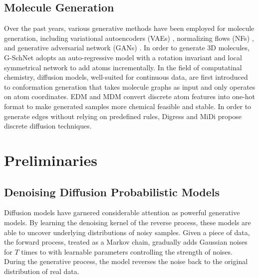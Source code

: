 \documentclass[letterpaper]{article} %
\begin{document}
\subsection{Molecule Generation}
Over the past years, various generative methods have been employed for molecule generation, including variational autoencoders (VAEs) \cite{vae_13_kingma}, normalizing flows (NFs) \cite{nice_15_dinh}, and generative adversarial network (GANs) \cite{gan_14_goodfellow}. In order to generate 3D molecules, G-SchNet \cite{gschnet_19_wallach} adopts an auto-regressive model with a rotation invariant and local symmetrical network to add atoms incrementally.
In the field of computatinal chemistry, diffusion models, well-suited for continuous data, are first introduced to conformation generation that takes molecule graphs as input and only operates on atom coordinates.
EDM \cite{edm_22_hoogeboom} and MDM \cite{mdm_23_huang} convert discrete atom features into one-hot format to make generated samples more chemical feasible and stable. In order to generate edges without relying on predefined rules, Digress \cite{digress_22_vignac} and MiDi \cite{midi_23_vignac} propose discrete diffusion techniques.





\section{Preliminaries}
\subsection{Denoising Diffusion Probabilistic Models}
Diffusion models have garnered considerable attention as powerful generative models. By learning the denoising kernel of the reverse process, these models are able to uncover underlying distributions of noisy samples. Given a piece of data, the forward process, treated as a Markov chain, gradually adds Gaussian noises for $T$ times to with learnable parameters controlling the strength of noises. During the generative process, the model reverses the noise back to the original distribution of real data.
\end{document}
